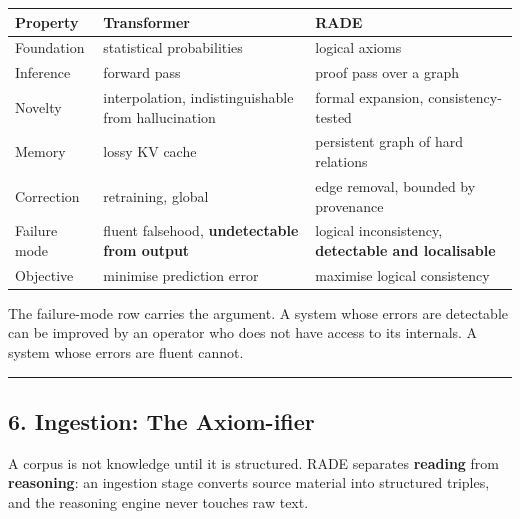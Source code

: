 \documentclass[
  11pt,
  a4paper,
]{article}
\begin{document}
\begin{longtable}[]{@{}
  >{\raggedright\arraybackslash}p{}
  >{\raggedright\arraybackslash}p{}
  >{\raggedright\arraybackslash}p{}@{}}
\toprule\noalign{}
\begin{minipage}[b]{\linewidth}\raggedright
Property
\end{minipage} & \begin{minipage}[b]{\linewidth}\raggedright
Transformer
\end{minipage} & \begin{minipage}[b]{\linewidth}\raggedright
RADE
\end{minipage} \\
\midrule\noalign{}
\endhead
\bottomrule\noalign{}
\endlastfoot
Foundation & statistical probabilities & logical axioms \\
Inference & forward pass & proof pass over a graph \\
Novelty & interpolation, indistinguishable from hallucination & formal
expansion, consistency-tested \\
Memory & lossy KV cache & persistent graph of hard relations \\
Correction & retraining, global & edge removal, bounded by provenance \\
Failure mode & fluent falsehood, \textbf{undetectable from output} &
logical inconsistency, \textbf{detectable and localisable} \\
Objective & minimise prediction error & maximise logical consistency \\
\end{longtable}

The failure-mode row carries the argument. A system whose errors are
detectable can be improved by an operator who does not have access to
its internals. A system whose errors are fluent cannot.

\begin{center}\rule{0.5\linewidth}{0.5pt}\end{center}

\subsection{6. Ingestion: The
Axiom-ifier}\label{ingestion-the-axiom-ifier}

A corpus is not knowledge until it is structured. RADE separates
\textbf{reading} from \textbf{reasoning}: an ingestion stage converts
source material into structured triples, and the reasoning engine never
touches raw text.
\end{document}
